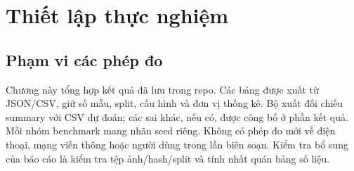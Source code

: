 \section{Thiết lập thực nghiệm}\label{sec:04-evaluation-setup}
\subsection{Phạm vi các phép đo}
Chương này tổng hợp kết quả đã lưu trong repo. Các bảng được xuất từ JSON/CSV, giữ số mẫu, split, cấu hình và đơn vị thống kê. Bộ xuất đối chiếu summary với CSV dự đoán; các sai khác, nếu có, được công bố ở phần kết quả. Mỗi nhóm benchmark mang nhãn seed riêng. Không có phép đo mới về điện thoại, mạng viễn thông hoặc người dùng trong lần biên soạn. Kiểm tra bổ sung của báo cáo là kiểm tra tệp ảnh/hash/split và tính nhất quán bảng số liệu.


